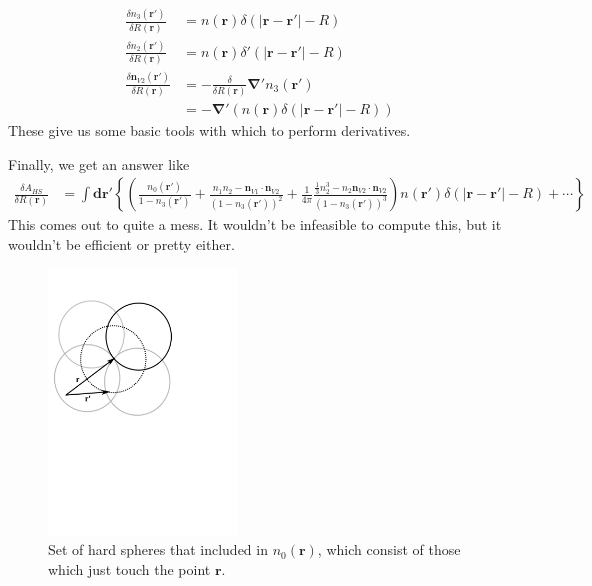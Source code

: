 \documentclass[letterpaper,twocolumn,amsmath,amssymb,prb]{revtex4-1}
\begin{document}
{  \begin{align}
    \frac{\delta n_3(\mathbf{r}')}{\delta R(\mathbf{r})} &=
    n(\mathbf{r})\delta(|\mathbf{r}-\mathbf{r}'| - R) \\
    \frac{\delta n_2(\mathbf{r}')}{\delta R(\mathbf{r})} &=
    n(\mathbf{r}) \delta'(|\mathbf{r}-\mathbf{r}'| - R) \\
    \frac{\delta \mathbf{n}_{V2}(\mathbf{r}')}{\delta R(\mathbf{r})} &=
    -\frac{\delta}{\delta R(\mathbf{r})} \mathbf{\nabla}' n_3(\mathbf{r}')
    \\
    &= -\mathbf{\nabla}'
    \left(n(\mathbf{r})\delta(|\mathbf{r}-\mathbf{r}'| - R) \right)
  \end{align}
  These give us some basic tools with which to perform derivatives.
  
  Finally, we get an answer like
  \begin{align}
    \frac{\delta A_{HS}}{\delta R(\mathbf{r})} &=
    \int \mathbf{dr}' \left\{
    \left(
    \frac{n_0(\mathbf{r}')}{1 - n_3(\mathbf{r}')}
    + \frac{n_1n_2 - \mathbf{n}_{V1}\cdot\mathbf{n}_{V2}}{(1 -
      n_3(\mathbf{r}'))^2}
    + \frac{1}{4\pi}\frac{
      \frac13 n_2^3 - n_2 \mathbf{n}_{V2} \cdot \mathbf{n}_{V2}
    }{
      (1-n_3(\mathbf{r}'))^3
    }
    \right) n(\mathbf{r}') \delta(|\mathbf{r}-\mathbf{r}'| - R)
    + \cdots
    \right\}
  \end{align}
  This comes out to quite a mess.  It wouldn't be infeasible to compute
  this, but it wouldn't be efficient or pretty either.
}

\begin{figure}
\includegraphics[width=5cm]{figs/n0}
\caption{Set of hard spheres that included in $n_0(\mathbf{r})$, which
  consist of those which just touch the point $\mathbf{r}$.}
\label{fig:n0}
\end{figure}
\end{document}
